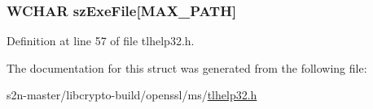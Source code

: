 \subsubsection[{\texorpdfstring{sz\+Exe\+File}{szExeFile}}]{\setlength{\rightskip}{0pt plus 5cm}W\+C\+H\+AR sz\+Exe\+File\mbox{[}M\+A\+X\+\_\+\+P\+A\+TH\mbox{]}}\hypertarget{structtag_p_r_o_c_e_s_s_e_n_t_r_y32_w_a8033179933bed45794a4cb9f90acf0cb}{}\label{structtag_p_r_o_c_e_s_s_e_n_t_r_y32_w_a8033179933bed45794a4cb9f90acf0cb}


Definition at line 57 of file tlhelp32.\+h.



The documentation for this struct was generated from the following file\+:\begin{DoxyCompactItemize}
\item 
s2n-\/master/libcrypto-\/build/openssl/ms/\hyperlink{tlhelp32_8h}{tlhelp32.\+h}\end{DoxyCompactItemize}

